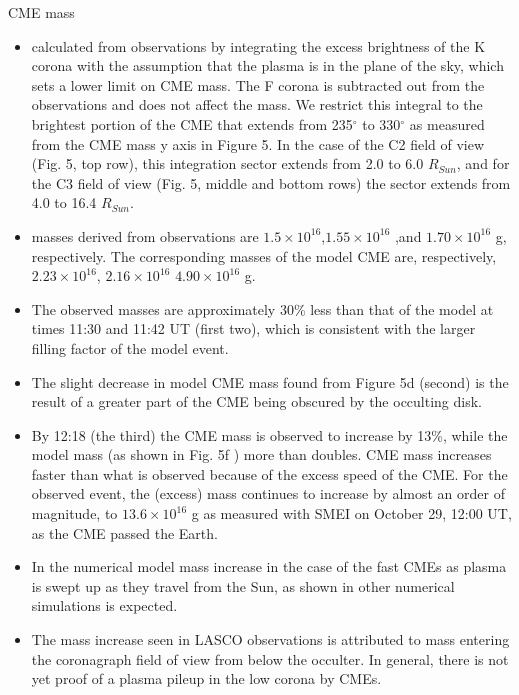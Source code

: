 \documentclass{beamer}
\begin{document}
\begin{frame}[allowframebreaks]{CME mass}

{\fontsize{10}{12}\selectfont
\begin{itemize}
\item calculated from observations by integrating the excess brightness of the K corona with
the assumption that the plasma is in the plane of the sky, which
sets a lower limit on CME mass. The F corona is subtracted out
from the observations and does not affect the mass. We restrict
this integral to the brightest portion of the CME that extends from
235$^\circ$ to 330$^\circ$ as measured from the CME mass y axis in Figure 5. In the case
of the C2 field of view (Fig. 5, top row), this integration sector
extends from 2.0 to 6.0 $R_{Sun}$, and for the C3 field of view (Fig. 5,
middle and bottom rows) the sector extends from 4.0 to 16.4 $R_{Sun}$. 
\item masses derived from observations
 are $1.5\times10^{16}$,$1.55\times10^{16}$ ,and $1.70\times10^{16}$  g, respectively. 
The corresponding masses of the
model CME  are, respectively,  $2.23\times10^{16}$, $2.16\times10^{16}$ $4.90\times10^{16}$ g.
\item The observed masses are approximately 30\% less than that of
the model at times  11:30 and 11:42 UT (first two), which is consistent
with the larger filling factor of the model event. 
\item The slight decrease
in model CME mass found from Figure 5d (second) is the result of a greater
part of the CME being obscured by the occulting disk. 
\item By 12:18  (the third) the CME mass is observed to increase by 13\%, while the model
mass (as shown in Fig. 5f ) more than doubles.
CME mass increases faster than what is observed because of the
excess speed of the CME. For the observed event, the (excess)
mass continues to increase by almost an order of magnitude, to
$13.6\times10^{16}$  g as measured with SMEI on October 29, 12:00 UT,
as the CME passed the Earth.
\item In the numerical model mass increase in the case of the  
fast CMEs as plasma is swept up as they travel from
the Sun, as shown in other numerical simulations is expected.
\item The mass increase seen in
LASCO observations is attributed to mass entering the coronagraph
field of view from below the occulter. In
general, there is not yet proof of a plasma pileup in the low corona
by CMEs. 
\end{itemize}
}
\end{frame}

\end{document}
